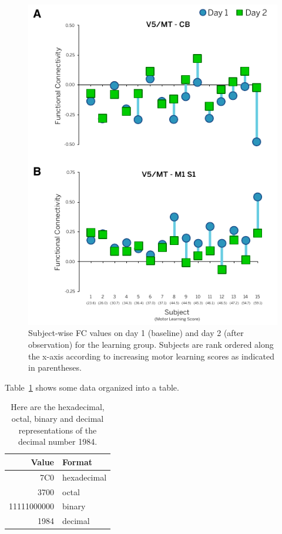 \documentclass[twocolumn]{preep}
\begin{document}
\begin{figure}
  \centering
  \includegraphics[width=0.95\columnwidth]{figure.pdf}
  \caption{Subject-wise FC values on day 1 (baseline) and day 2 (after
    observation) for the learning group. Subjects are rank ordered
    along the x-axis according to increasing motor learning scores as
    indicated in parentheses.}
  \label{fig:subjectmeans}
\end{figure}    

Table~\ref{tab:randomjunk} shows some data organized into a table.

\begin{table}
  \centering
  \begin{tabular}{|r|l|}
    \hline
    \textbf{Value} & \textbf{Format}\\
    \hline\hline
  7C0 & hexadecimal \\
  3700 & octal \\ \cline{2-2}
  11111000000 & binary \\
  \hline
  1984 & decimal \\
  \hline
  \end{tabular}
  \caption{Here are the hexadecimal, octal, binary and decimal
    representations of the decimal number 1984.}
  \label{tab:randomjunk}
\end{table}
\end{document}
